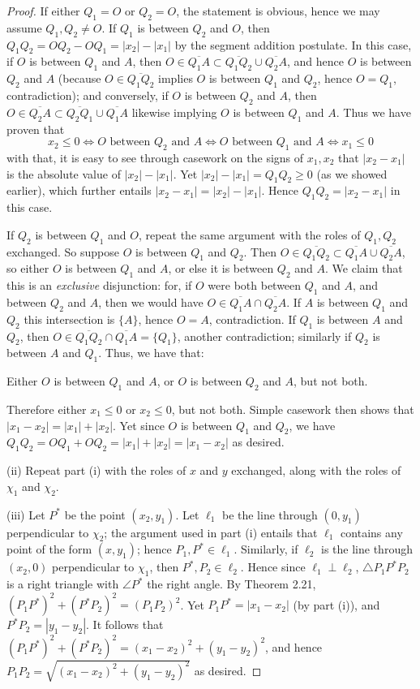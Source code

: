 \documentclass[leqno]{book}
\begin{document}
\begin{proof}
If either $Q_1=O$ or $Q_2=O$, the statement is obvious, hence we may assume $Q_1,Q_2\ne O$.  If $Q_1$ is between $Q_2$ and $O$, then $Q_1Q_2=OQ_2-OQ_1=|x_2|-|x_1|$ by the segment addition postulate.  In this case, if $O$ is between $Q_1$ and $A$, then $O\in\overline{Q_1A}\subset\overline{Q_1Q_2}\cup\overline{Q_2A}$, and hence $O$ is between $Q_2$ and $A$ (because $O\in\overline{Q_1Q_2}$ implies $O$ is between $Q_1$ and $Q_2$, hence $O=Q_1$, contradiction); and conversely, if $O$ is between $Q_2$ and $A$, then $O\in\overline{Q_2A}\subset\overline{Q_2Q_1}\cup\overline{Q_1A}$ likewise implying $O$ is between $Q_1$ and $A$.  Thus we have proven that
$$x_2\leqslant 0\iff O\text{ between }Q_2\text{ and }A\iff O\text{ between }Q_1\text{ and }A\iff x_1\leqslant 0$$
with that, it is easy to see through casework on the signs of $x_1,x_2$ that $|x_2-x_1|$ is the absolute value of $|x_2|-|x_1|$.  Yet $|x_2|-|x_1|=Q_1Q_2\geqslant 0$ (as we showed earlier), which further entails $|x_2-x_1|=|x_2|-|x_1|$.  Hence $Q_1Q_2=|x_2-x_1|$ in this case.

If $Q_2$ is between $Q_1$ and $O$, repeat the same argument with the roles of $Q_1,Q_2$ exchanged.  So suppose $O$ is between $Q_1$ and $Q_2$.  Then $O\in\overline{Q_1Q_2}\subset\overline{Q_1A}\cup\overline{Q_2A}$, so either $O$ is between $Q_1$ and $A$, or else it is between $Q_2$ and $A$.  We claim that this is an \emph{exclusive} disjunction: for, if $O$ were both between $Q_1$ and $A$, and between $Q_2$ and $A$, then we would have $O\in\overline{Q_1A}\cap\overline{Q_2A}$.  If $A$ is between $Q_1$ and $Q_2$ this intersection is $\{A\}$, hence $O=A$, contradiction.  If $Q_1$ is between $A$ and $Q_2$, then $O\in\overline{Q_1Q_2}\cap\overline{Q_1A}=\{Q_1\}$, another contradiction; similarly if $Q_2$ is between $A$ and $Q_1$.  Thus, we have that:
\begin{center}
Either $O$ is between $Q_1$ and $A$, or $O$ is between $Q_2$ and $A$, but not both.
\end{center}
Therefore either $x_1\leqslant 0$ or $x_2\leqslant 0$, but not both.  Simple casework then shows that $|x_1-x_2|=|x_1|+|x_2|$.  Yet since $O$ is between $Q_1$ and $Q_2$, we have $Q_1Q_2=OQ_1+OQ_2=|x_1|+|x_2|=|x_1-x_2|$ as desired.

(ii) Repeat part (i) with the roles of $x$ and $y$ exchanged, along with the roles of $\chi_1$ and $\chi_2$.

(iii) Let $P^*$ be the point $(x_2,y_1)$.  Let $\ell_1$ be the line through $(0,y_1)$ perpendicular to $\chi_2$; the argument used in part (i) entails that $\ell_1$ contains any point of the form $(x,y_1)$; hence $P_1,P^*\in\ell_1$.  Similarly, if $\ell_2$ is the line through $(x_2,0)$ perpendicular to $\chi_1$, then $P^*,P_2\in\ell_2$.  Hence since $\ell_1\perp\ell_2$, $\triangle P_1P^*P_2$ is a right triangle with $\angle P^*$ the right angle.  By Theorem 2.21, $(P_1P^*)^2+(P^*P_2)^2=(P_1P_2)^2$.  Yet $P_1P^*=|x_1-x_2|$ (by part (i)), and $P^*P_2=|y_1-y_2|$.  It follows that $(P_1P^*)^2+(P^*P_2)^2=(x_1-x_2)^2+(y_1-y_2)^2$, and hence $P_1P_2=\sqrt{(x_1-x_2)^2+(y_1-y_2)^2}$ as desired.
\end{proof}
\end{document}
